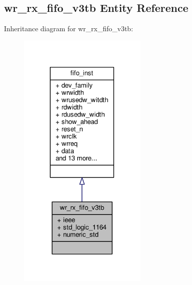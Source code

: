 \subsection{wr\+\_\+rx\+\_\+fifo\+\_\+v3tb Entity Reference}
\label{classwr__rx__fifo__v3tb}


Inheritance diagram for wr\+\_\+rx\+\_\+fifo\+\_\+v3tb\+:\nopagebreak
\begin{figure}[H]
\begin{center}
\leavevmode
\includegraphics[width=176pt]{d0/d77/classwr__rx__fifo__v3tb__inherit__graph}
\end{center}
\end{figure}


